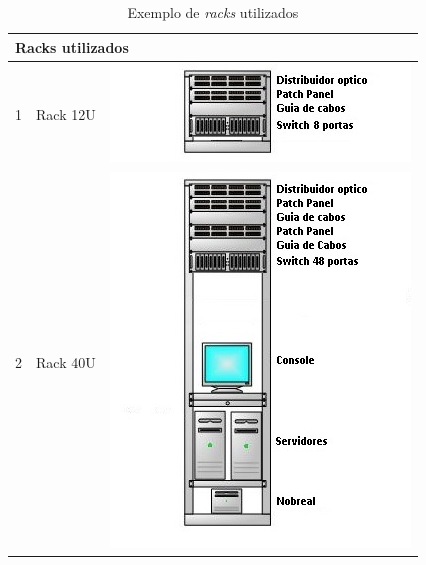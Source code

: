 \begin{table}[h!]
\centering
\caption{Exemplo de \textit{racks} utilizados}
\label{tab1}
\begin{tabular}{|l|l|l|}
\hline
\multicolumn{3}{|l|}{Racks utilizados} \\ \hline
1        & Rack 12U          & \includegraphics[scale=0.8]{figura5}        \\ \hline
2        & Rack 40U        & \includegraphics[scale=0.8]{figura6}        \\ \hline
\end{tabular}
\end{table}
